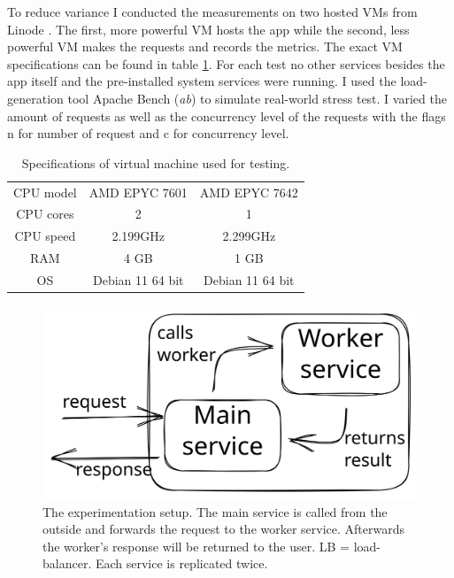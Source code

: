 \documentclass[sigconf,review,9pt]{acmart}
\begin{document}
To reduce variance I conducted the measurements on two hosted VMs from Linode \cite{Linode}.
The first, more powerful VM hosts the app while the second, less powerful VM makes
the requests and records the metrics.
The exact VM specifications can be found in table \ref{tab:linode}.
For each test no other services besides the app itself and the pre-installed system services were running.
I used the load-generation tool Apache Bench (\emph{ab}) \cite{ApacheHTTPServer} to simulate
real-world stress test.
I varied the amount of requests as well as the concurrency level of the requests with
the flags n for number of request and c for concurrency level.

\begin{table}
	\caption{Specifications of virtual machine used for testing.}
	\label{tab:linode}
	\begin{tabular}{ccc}
		\toprule
		CPU model & AMD EPYC 7601    & AMD EPYC 7642    \\
		CPU cores & 2                & 1                \\
		CPU speed & 2.199GHz         & 2.299GHz         \\
		RAM       & 4 GB             & 1 GB             \\
		OS        & Debian 11 64 bit & Debian 11 64 bit \\
		\bottomrule
	\end{tabular}
\end{table}


\begin{figure}
	\includegraphics[width=\columnwidth]{setup.excalidraw}
	\caption{The experimentation setup. The main service is called from the outside and
		forwards the request to the worker service.
		Afterwards the worker's response will be returned to the user. LB = load-balancer.
		Each service is replicated twice.}
	\label{fig:architecture}
\end{figure}
\end{document}
